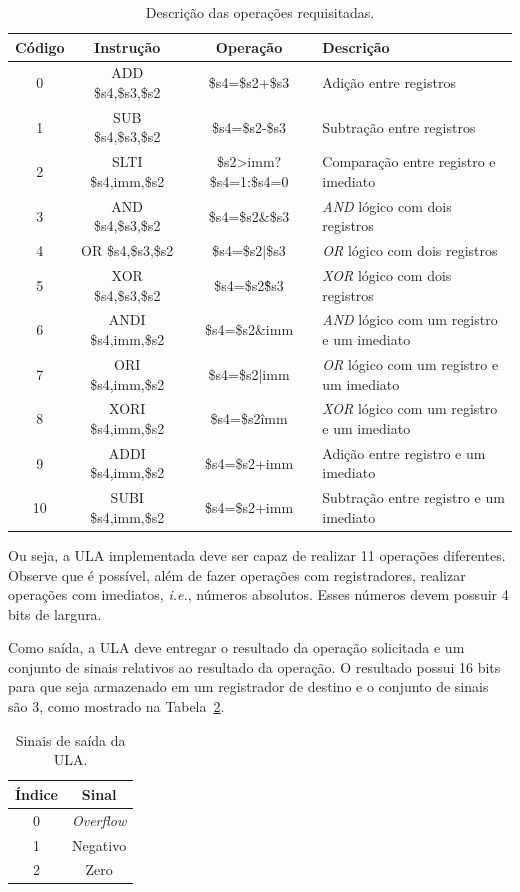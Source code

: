 \documentclass[11pt,a4paper,titlepage]{article}
\begin{document}
\begin{table}[h]
\centering
\begin{tabular}{| c | c | c | l |}
\hline
Código & Instrução & Operação & Descrição\\
\hline
0 & ADD \$s4,\$s3,\$s2 & \$s4=\$s2+\$s3 & Adição entre registros\\
\hline
1 & SUB \$s4,\$s3,\$s2 & \$s4=\$s2-\$s3 & Subtração entre registros \\
\hline
2 & SLTI \$s4,imm,\$s2 & \$s2>imm?\$s4=1:\$s4=0 & Comparação entre registro e imediato \\
\hline
3 & AND \$s4,\$s3,\$s2 & \$s4=\$s2\&\$s3 & \textit{AND} lógico com dois registros\\
\hline
4 & OR \$s4,\$s3,\$s2 &  \$s4=\$s2|\$s3 & \textit{OR} lógico com dois registros\\
\hline
5 & XOR \$s4,\$s3,\$s2 &  \$s4=\$s2\^\$s3 & \textit{XOR} lógico com dois registros\\
\hline
6 & ANDI \$s4,imm,\$s2 & \$s4=\$s2\&imm & \textit{AND} lógico com um registro e um imediato\\
\hline
7 & ORI \$s4,imm,\$s2 & \$s4=\$s2|imm & \textit{OR} lógico com um registro e um imediato \\
\hline
8 & XORI \$s4,imm,\$s2 & \$s4=\$s2\^imm & \textit{XOR} lógico com um registro e um imediato \\
\hline
9 & ADDI \$s4,imm,\$s2 & \$s4=\$s2+imm & Adição entre registro e um imediato\\
\hline
10 & SUBI \$s4,imm,\$s2 & \$s4=\$s2+imm & Subtração entre registro e um imediato\\
\hline
\end{tabular}
\caption{Descrição das operações requisitadas.}
\label{tab:ULA}
\end{table}
%

Ou seja, a ULA implementada deve ser capaz de realizar 11 operações diferentes.
Observe que é possível, além de fazer operações com registradores, realizar operações com imediatos, \textit{i.e.}, números absolutos.
Esses números devem possuir 4 bits de largura.

Como saída, a ULA deve entregar o resultado da operação solicitada e um conjunto de sinais relativos ao resultado da operação.
O resultado possui 16 bits para que seja armazenado em um registrador de destino e o conjunto de sinais são 3, como mostrado na Tabela~\ref{tab:flags}.

\begin{table}[h]
\centering
\begin{tabular}{| c | c |}
\hline
Índice & Sinal\\
\hline
0 & \textit{Overflow}\\
\hline
1 & Negativo \\
\hline
2 & Zero\\
\hline
\end{tabular}
\caption{Sinais de saída da ULA.}
\label{tab:flags}
\end{table}
%
\end{document}
